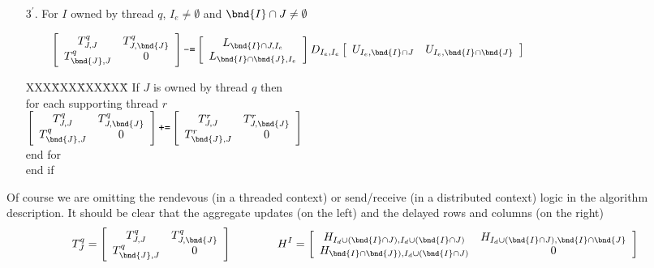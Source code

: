 \begin{itemize}
\item[$3^\prime.$]
For $I$ owned by thread $q$, 
$I_e \ne \emptyset$
and $\bnd{I} \cap J \ne \emptyset$
\par
$\mbox{\qquad}\displaystyle
\left \lbrack \begin{array}{cc}
T^q_{J,J} & T^q_{J, \bnd{J}} \\
T^q_{\bnd{J},J} & 0
\end{array} \right \rbrack
\mbox{\tt -=}
\left \lbrack \begin{array}{c}
L_{\bnd{I}\cap J,I_e} \\
L_{\bnd{I}\cap \bnd{J},I_e} 
\end{array} \right \rbrack
D_{I_e,I_e}
\left \lbrack \begin{array}{cc}
U_{I_e, \bnd{I} \cap J} & U_{I_e, \bnd{I}\cap \bnd{J}} 
\end{array} \right \rbrack
$
\begin{tabbing}
XXX\=XXX\=XXX\=XXX\=\kill
If $J$ is owned by thread $q$ then \\
\> for each supporting thread $r$ \\
\>\> $\displaystyle
\left \lbrack \begin{array}{cc}
T^q_{J,J} & T^q_{J, \bnd{J}} \\
T^q_{\bnd{J},J} & 0
\end{array} \right \rbrack
\mbox{\tt +=}
\left \lbrack \begin{array}{cc}
T^r_{J,J} & T^r_{J, \bnd{J}} \\
T^r_{\bnd{J},J} & 0
\end{array} \right \rbrack
$ \\
\> end for \\
end if
\end{tabbing}
\end{itemize}
Of course we are omitting the rendevous (in a threaded context)
or send/receive (in a distributed context) logic in the algorithm
description. It should be clear that the aggregate updates
(on the left)
and the delayed rows and columns 
(on the right)
$$
T_J^q =
\left \lbrack \begin{array}{cc}
T^q_{J,J} & T^q_{J, \bnd{J}} \\
T^q_{\bnd{J},J} & 0
\end{array} \right \rbrack
\qquad \qquad
H^I =
\left \lbrack \begin{array}{cc}
H_{I_d \cup (\bnd{I} \cap J), I_d \cup (\bnd{I} \cap J)}
& H_{I_d \cup (\bnd{I} \cap J), \bnd{I} \cap \bnd{J}} \\
H_{\bnd{I} \cap \bnd{J}), I_d \cup (\bnd{I} \cap J)} & 0
\end{array} \right \rbrack
$$
